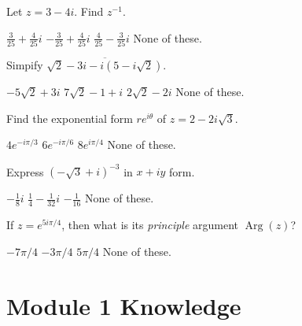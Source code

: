 \documentclass[12pt]{exam}
\begin{document}
\begin{questions}

\setcounter{question}{0}


\question Let \(z=3-4i\). Find \(z^{-1}\).
\begin{choices}
\choice \(\frac{3}{25}+\frac{4}{25}i\)
\choice \(-\frac{3}{25}+\frac{4}{25}i\)
\choice \(\frac{4}{25}-\frac{3}{25}i\)
\choice None of these. 
\end{choices}

\question Simpify \(\overline{\sqrt2 - 3i - i(5-i\sqrt2)}\). 
\begin{choices}
\choice \(-5\sqrt2 +3i\)
\choice \(7\sqrt2 -1+i\)
\choice \(2\sqrt2 -2i \)
\choice None of these. 
\end{choices}


\question Find the exponential form \(re^{i\theta}\) of \(z=2-2i\sqrt 3\).
\begin{choices}
\choice \(4e^{-i\pi/3}\)
\choice \(6e^{-i\pi/6}\)
\choice \(8e^{i\pi/4}\)
\choice None of these. 
\end{choices}

\question Express \((-\sqrt3+i)^{-3}\) in \(x+iy\) form.
\begin{choices}
\choice \(-\frac{1}{8}i\)
\choice \(\frac{1}{4}-\frac{1}{32}i\)
\choice \(-\frac{1}{16}\)
\choice None of these. 
\end{choices}

\question If \(z=e^{5i\pi/4}\), then what is its \textit{principle} argument
\(\operatorname{Arg}(z)\)?
\begin{choices}
\choice \(-7\pi/4\) 
\choice \(-3\pi/4\) 
\choice \(5\pi/4\) 
\choice None of these. 
\end{choices}
\end{questions}

\section*{Module 1 Knowledge}
\end{document}
